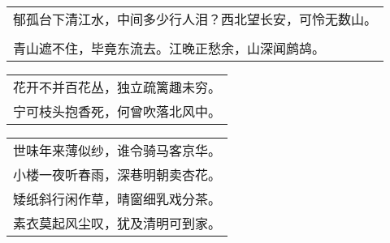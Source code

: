 \nopagebreak%
\nopagebreak%
\noindent\begin{minipage}{\linewidth}
  \vskip-3pt\begin{table}[H]
    \centering
    \begin{tabular}{@{}l@{}}
郁孤台下清江水，中间多少行人泪？西北望长安，可怜无数山。\\
\\
青山遮不住，毕竟东流去。江晚正愁余，山深闻鹧鸪。
    \end{tabular}
  \end{table}
\end{minipage}
\vspace{1cm}


\nopagebreak%
\nopagebreak%
\noindent\begin{minipage}{\linewidth}
  \vskip-3pt\begin{table}[H]
    \centering
    \begin{tabular}{@{}l@{}}
花开不并百花丛，独立疏篱趣未穷。\\
宁可枝头抱香死，何曾吹落北风中。
    \end{tabular}
  \end{table}
\end{minipage}
\vspace{1cm}


\nopagebreak%
\nopagebreak%
\noindent\begin{minipage}{\linewidth}
  \vskip-3pt\begin{table}[H]
    \centering
    \begin{tabular}{@{}l@{}}
世味年来薄似纱，谁令骑马客京华。\\
小楼一夜听春雨，深巷明朝卖杏花。\\
矮纸斜行闲作草，晴窗细乳戏分茶。\\
素衣莫起风尘叹，犹及清明可到家。
    \end{tabular}
  \end{table}
\end{minipage}
\vspace{1cm}


